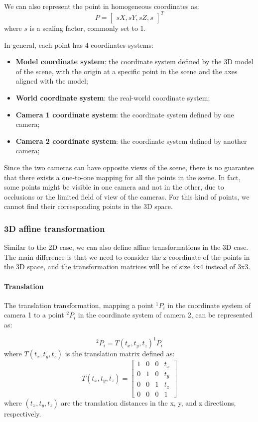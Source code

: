 We can also represent the point in homogeneous coordinates as:
\[ P = \begin{bmatrix} sX, sY, sZ, s \end{bmatrix}^T \]
where \( s \) is a scaling factor, commonly set to 1.

In general, each point has 4 coordinates systems:
\begin{itemize}
    \item \textbf{Model coordinate system}: the coordinate system defined by the 3D model of the scene, with the origin at a specific point in the scene and the axes aligned with the model;
    \item \textbf{World coordinate system}: the real-world coordinate system;
    \item \textbf{Camera 1 coordinate system}: the coordinate system defined by one camera;
    \item \textbf{Camera 2 coordinate system}: the coordinate system defined by another camera;
\end{itemize}
Since the two cameras can have opposite views of the scene, there is no guarantee that there exists 
a one-to-one mapping for all the points in the scene. 
In fact, some points might be visible in one camera and not in the other, due to occlusions or the limited field of view of the cameras.
For this kind of points, we cannot find their corresponding points in the 3D space.

\subsubsection{3D affine transformation}
Similar to the 2D case, we can also define affine transformations in the 3D case.
The main difference is that we need to consider the z-coordinate of the points in the 3D space, 
and the transformation matrices will be of size 4x4 instead of 3x3.

\paragraph{Translation}
The translation transformation, mapping a point \( ^1P_i \) in the coordinate system of camera 1 to a point \( ^2P_i \) in the coordinate system of camera 2, can be represented as:

\[ ^2P_i = T(t_x, t_y, t_z) ^1P_i \]
where \( T(t_x, t_y, t_z) \) is the translation matrix defined as:
\[ T(t_x, t_y, t_z) = \begin{bmatrix}
    1 & 0 & 0 & t_x \\
    0 & 1 & 0 & t_y \\
    0 & 0 & 1 & t_z \\
    0 & 0 & 0 & 1
\end{bmatrix} \]
where \( (t_x, t_y, t_z) \) are the translation distances in the x, y, and z directions, respectively.

